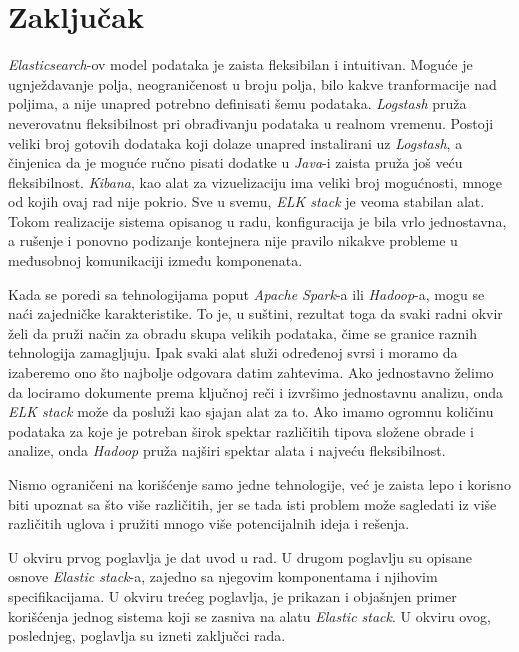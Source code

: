 \chapter{Zaključak}
\textit{Elasticsearch}-ov model podataka je zaista fleksibilan i intuitivan. Moguće je ugnježdavanje polja, neograničenost u broju polja, bilo kakve tranformacije nad poljima, a nije unapred potrebno definisati šemu podataka. \textit{Logstash} pruža neverovatnu fleksibilnost pri obrađivanju podataka u realnom vremenu. Postoji veliki broj gotovih dodataka koji dolaze unapred instalirani uz \textit{Logstash}, a činjenica da je moguće ručno pisati dodatke u \textit{Java}-i zaista pruža još veću fleksibilnost. \textit{Kibana}, kao alat za vizuelizaciju ima veliki broj mogućnosti, mnoge od kojih ovaj rad nije pokrio. Sve u svemu, \textit{ELK stack} je veoma stabilan alat. Tokom realizacije sistema opisanog u radu, konfiguracija je bila vrlo jednostavna, a rušenje i ponovno podizanje kontejnera nije pravilo nikakve probleme u međusobnoj komunikaciji između komponenata.

\par
Kada se poredi sa tehnologijama poput \textit{Apache Spark}-a ili \textit{Hadoop}-a, mogu se naći zajedničke karakteristike. To je, u suštini, rezultat toga da svaki radni okvir želi da pruži način za obradu skupa velikih podataka, čime se granice raznih tehnologija zamagljuju. Ipak svaki alat služi određenoj svrsi i moramo da izaberemo ono što najbolje odgovara datim zahtevima. Ako jednostavno želimo da lociramo dokumente prema ključnoj reči i izvršimo jednostavnu analizu, onda \textit{ELK stack} može da posluži kao sjajan alat za to. Ako imamo ogromnu količinu podataka za koje je potreban širok spektar različitih tipova složene obrade i analize, onda \textit{Hadoop} pruža najširi spektar alata i najveću fleksibilnost. 

\par
Nismo ograničeni na korišćenje samo jedne tehnologije, već je zaista lepo i korisno biti upoznat sa što više različitih, jer se tada isti problem može sagledati iz više različitih uglova i pružiti mnogo više potencijalnih ideja i rešenja.

\par
U okviru prvog poglavlja je dat uvod u rad. U drugom poglavlju su opisane osnove \textit{Elastic stack}-a, zajedno sa njegovim komponentama i njihovim specifikacijama. U okviru trećeg poglavlja, je prikazan i objašnjen primer korišćenja jednog sistema koji se zasniva na alatu \textit{Elastic stack}. U okviru ovog, poslednjeg, poglavlja su izneti zaključci rada.